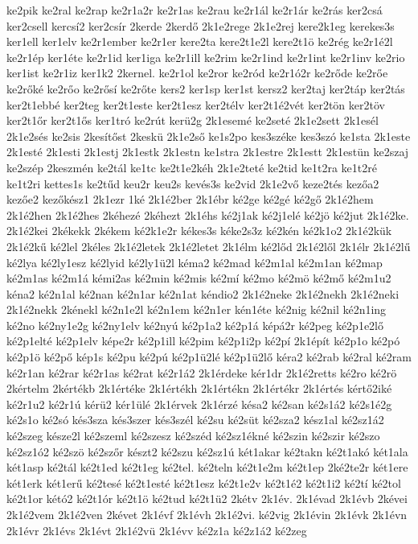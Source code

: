 {ke2pik
ke2ral
ke2rap
ke2r1a2r
ke2r1as
ke2rau
ke2r1ál
ke2r1ár
ke2rás
ker2csá
ker2csell
kercsí2
ker2csír
2kerde
2kerdő
2k1e2rege
2k1e2rej
kere2k1eg
kerekes3s
ker1ell
ker1elv
ke2r1ember
ke2r1er
kere2ta
kere2t1e2l
kere2t1ö
ke2rég
ke2r1é2l
ke2r1ép
ker1éte
ke2r1id
ker1iga
ke2r1ill
ke2rim
ke2r1ind
ke2r1int
ke2r1inv
ke2rio
ker1ist
ke2r1iz
ker1k2
2kernel.
ke2r1ol
ke2ror
ke2ród
ke2r1ó2r
ke2rőde
ke2rőe
ke2rőké
ke2rőo
ke2rősí
ke2rőte
kers2
ker1sp
ker1st
kersz2
ker2taj
ker2táp
ker2tás
ker2t1ebbé
ker2teg
ker2t1este
ker2t1esz
ker2télv
ker2t1é2vét
ker2tön
ker2töv
ker2t1őr
ker2t1ős
ker1tró
ke2rút
kerü2g
2k1esemé
ke2seté
2k1e2sett
2k1esél
2k1e2sés
ke2sis
2kesítőst
2keskü
2k1e2ső
ke1s2po
kes3széke
kes3szó
ke1sta
2k1este
2k1esté
2k1esti
2k1estj
2k1estk
2k1estn
ke1stra
2k1estre
2k1estt
2k1estün
ke2szaj
ke2szép
2keszmén
ke2tál
ke1tc
ke2t1e2kéh
2k1e2teté
ke2tid
ke1t2ra
ke1t2ré
ke1t2ri
kettes1s
ke2tűd
keu2r
keu2s
kevés3s
ke2vid
2k1e2vő
keze2tés
kezőa2
kezőe2
kezőkész1
2k1ezr
1ké
2k1é2ber
2k1ébr
ké2ge
ké2gé
ké2gő
2k1é2hem
2k1é2hen
2k1é2hes
2kéhezé
2kéhezt
2k1éhs
ké2j1ak
ké2j1elé
ké2jö
ké2jut
2k1é2ke.
2k1é2kei
2kékekk
2kékem
ké2k1e2r
kékes3s
kéke2s3z
ké2kén
ké2k1o2
2k1é2kük
2k1é2kű
ké2lel
2kéles
2k1é2letek
2k1é2letet
2k1élm
ké2lőd
2k1é2lől
2k1élr
2k1é2lű
ké2lya
ké2ly1esz
ké2lyid
ké2ly1ü2l
kéma2
ké2mad
ké2m1al
ké2m1an
ké2map
ké2m1as
ké2m1á
kémi2as
ké2min
ké2mis
ké2mí
ké2mo
ké2mö
ké2mő
ké2m1u2
kéna2
ké2n1al
ké2nan
ké2n1ar
ké2n1at
kéndio2
2k1é2neke
2k1é2nekh
2k1é2neki
2k1é2nekk
2kénekl
ké2n1e2l
ké2n1em
ké2n1er
kén1éte
ké2nig
ké2nil
ké2n1ing
ké2no
ké2ny1e2g
ké2ny1elv
ké2nyú
ké2p1a2
ké2p1á
képá2r
ké2peg
ké2p1e2lő
ké2p1elté
ké2p1elv
képe2r
ké2p1ill
ké2pim
ké2p1i2p
ké2pí
2k1épít
ké2p1o
ké2pó
ké2p1ö
ké2pő
kép1s
ké2pu
ké2pú
ké2p1ü2lé
ké2p1ü2lő
kéra2
ké2rab
ké2ral
ké2ram
ké2r1an
ké2rar
ké2r1as
ké2rat
ké2r1á2
2k1érdeke
kér1dr
2k1é2retts
ké2ro
ké2rö
2kértelm
2kértékb
2k1értéke
2k1értékh
2k1értékn
2k1értékr
2k1értés
kértő2iké
ké2r1u2
ké2r1ú
kérü2
kér1ülé
2k1érvek
2k1érzé
késa2
ké2san
ké2s1á2
ké2s1é2g
ké2s1o
ké2só
kés3sza
kés3szer
kés3szél
ké2su
ké2süt
ké2sza2
kész1al
ké2sz1á2
ké2szeg
késze2l
ké2szeml
ké2szesz
ké2széd
ké2sz1ékné
ké2szin
ké2szir
ké2szo
ké2sz1ó2
ké2szö
ké2szőr
készt2
ké2szu
ké2sz1ú
két1akar
ké2takn
ké2t1akó
két1ala
két1asp
ké2tál
ké2t1ed
ké2t1eg
ké2tel.
ké2teln
ké2t1e2m
ké2t1ep
2ké2te2r
két1ere
két1erk
két1erű
ké2tesé
ké2t1esté
ké2t1esz
ké2t1e2v
ké2t1é2
ké2t1i2
ké2tí
ké2tol
ké2t1or
kétó2
ké2t1ór
ké2t1ö
ké2tud
ké2t1ü2
2kétv
2k1év.
2k1évad
2k1évb
2kévei
2k1é2vem
2k1é2ven
2kévet
2k1évf
2k1évh
2k1é2vi.
ké2vig
2k1évin
2k1évk
2k1évn
2k1évr
2k1évs
2k1évt
2k1é2vü
2k1évv
ké2z1a
ké2z1á2
ké2zeg
}
